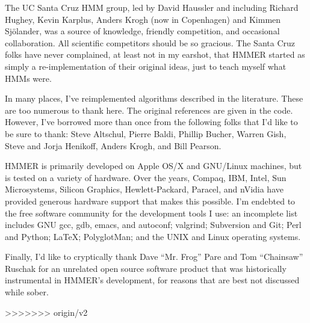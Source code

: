 The UC Santa Cruz HMM group, led by David Haussler and including
Richard Hughey, Kevin Karplus, Anders Krogh (now in Copenhagen) and
Kimmen Sj\"{o}lander, was a source of knowledge, friendly competition,
and occasional collaboration. All scientific competitors should be so
gracious. The Santa Cruz folks have never complained, at least not in
my earshot, that HMMER started as simply a re-implementation of their
original ideas, just to teach myself what HMMs were.

In many places, I've reimplemented algorithms described in the
literature. These are too numerous to thank here. The original
references are given in the code. However, I've borrowed more than
once from the following folks that I'd like to be sure to thank: Steve
Altschul, Pierre Baldi, Phillip Bucher, Warren Gish, Steve and Jorja
Henikoff, Anders Krogh, and Bill Pearson.

HMMER is primarily developed on Apple OS/X and GNU/Linux machines, but
is tested on a variety of hardware. Over the years, Compaq, IBM,
Intel, Sun Microsystems, Silicon Graphics, Hewlett-Packard, Paracel,
and nVidia have provided generous hardware support that makes this
possible. I'm endebted to the free software community for the
development tools I use: an incomplete list includes GNU gcc, gdb,
emacs, and autoconf; valgrind; Subversion and Git; Perl and Python;
\LaTeX; PolyglotMan; and the UNIX and Linux operating systems.

Finally, I'd like to cryptically thank Dave ``Mr. Frog'' Pare and Tom
``Chainsaw'' Ruschak for an unrelated open source software product
that was historically instrumental in HMMER's development, for reasons
that are best not discussed while sober.



>>>>>>> origin/v2

